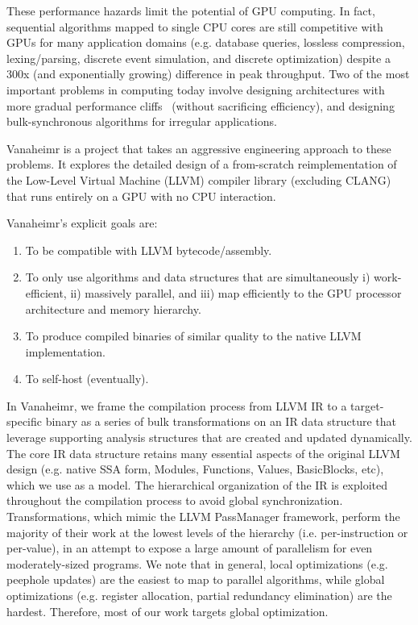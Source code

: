 \documentclass[conference, 10pt]{IEEEtran}
\begin{document}
These performance hazards limit the potential of GPU computing. In fact,
sequential algorithms mapped to single CPU cores are still competitive with GPUs
for many application domains (e.g. database queries, lossless compression,
lexing/parsing, discrete event simulation, and discrete optimization) despite a
300x (and exponentially growing) difference in peak throughput.  Two of the most
important problems in computing today involve designing architectures with more
gradual performance cliffs~\cite{ref:echelon} (without sacrificing 
efficiency), and designing bulk-synchronous algorithms for irregular
applications.  

Vanaheimr is a project that takes an aggressive engineering approach to these
problems. It explores the detailed design of a from-scratch reimplementation of
the Low-Level Virtual Machine (LLVM) compiler library (excluding CLANG) that
runs entirely on a GPU with no CPU interaction.  

Vanaheimr's explicit goals are: 

\begin{enumerate}
	\item To be compatible with LLVM bytecode/assembly.
	\item To only use algorithms and data structures that are simultaneously
	      i) work-efficient, ii) massively parallel, and iii) map efficiently to
	      the GPU processor architecture and memory hierarchy.
	\item To produce compiled binaries of similar quality to the native LLVM
	      implementation.
	\item To self-host (eventually).
\end{enumerate}

In Vanaheimr, we frame the compilation process from LLVM IR to a
target-specific binary as a series of bulk transformations on an IR data
structure that leverage supporting analysis structures that are created and
updated dynamically.  The core IR data structure retains many essential aspects
of  the original LLVM design (e.g. native SSA form, Modules, Functions, Values,
BasicBlocks, etc), which we use as a model.  The hierarchical organization of
the IR is exploited throughout the compilation process to avoid global
synchronization.  Transformations, which mimic the LLVM PassManager framework,
perform the majority
of their work at the lowest levels of the hierarchy (i.e. per-instruction or
per-value), in an attempt to expose a large amount of parallelism for even
moderately-sized programs.  We note that in general, local optimizations
(e.g. peephole updates) are the easiest to map to parallel algorithms, while
global optimizations (e.g. register allocation, partial redundancy elimination)
are the hardest.  Therefore, most of our work targets global optimization.
\end{document}
